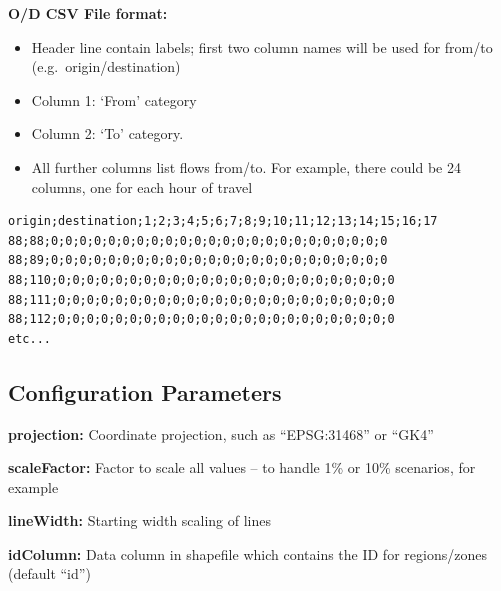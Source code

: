 \noindent\textbf{O/D CSV File format:}

\begin{itemize}
\tightlist
\item
  Header line contain labels; first two column names will be used for
  from/to (e.g.~origin/destination)
\item
  Column 1: `From' category
\item
  Column 2: `To' category.
\item
  All further columns list flows from/to. For example, there could be 24
  columns, one for each hour of travel
\end{itemize}

\begin{lstlisting}
origin;destination;1;2;3;4;5;6;7;8;9;10;11;12;13;14;15;16;17
88;88;0;0;0;0;0;0;0;0;0;0;0;0;0;0;0;0;0;0;0;0;0;0;0;0
88;89;0;0;0;0;0;0;0;0;0;0;0;0;0;0;0;0;0;0;0;0;0;0;0;0
88;110;0;0;0;0;0;0;0;0;0;0;0;0;0;0;0;0;0;0;0;0;0;0;0;0
88;111;0;0;0;0;0;0;0;0;0;0;0;0;0;0;0;0;0;0;0;0;0;0;0;0
88;112;0;0;0;0;0;0;0;0;0;0;0;0;0;0;0;0;0;0;0;0;0;0;0;0
etc...
\end{lstlisting}

\hypertarget{configuration-parameters}{%
\subsection{Configuration Parameters}\label{configuration-parameters}}

\noindent\textbf{projection:} Coordinate projection, such as ``EPSG:31468'' or
``GK4''

\noindent\textbf{scaleFactor:} Factor to scale all values -- to handle 1\% or
10\% scenarios, for example

\noindent\textbf{lineWidth:} Starting width scaling of lines

\noindent\textbf{idColumn:} Data column in shapefile which contains the ID for
regions/zones (default ``id'')
